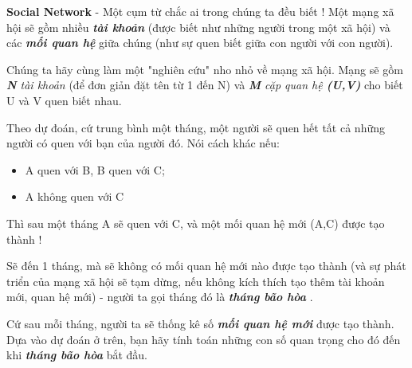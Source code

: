 \textbf{    Social Network   }   - Một cụm từ chắc ai trong chúng ta đều biết ! Một mạng xã hội sẽ gồm nhiều   \emph{\textbf{     tài khoản    }}   (được biết như những người trong một xã hội) và các   \emph{\textbf{     mối quan hệ    }}   giữa chúng (như sự quen biết giữa con người với con người).  

   Chúng ta hãy cùng làm một "nghiên cứu" nho nhỏ về mạng xã hội. Mạng sẽ gồm   \emph{\textbf{     N    }    tài khoản   }   (để đơn giản đặt tên từ 1 đến N) và   \emph{\textbf{     M    }    cặp quan hệ    \textbf{     (U,V)    }}   cho biết U và V quen biết nhau.  

   Theo dự đoán, cứ trung bình một tháng, một người sẽ quen hết tất cả những người có quen với bạn của người đó. Nói cách khác nếu:  
\begin{itemize}
	\item     A quen với B, B quen với C;   
	\item     A không quen với C   
\end{itemize}

   Thì sau một tháng A sẽ quen với C, và một mối quan hệ mới (A,C) được tạo thành !  

   Sẽ đến 1 tháng, mà sẽ không có mối quan hệ mới nào được tạo thành (và sự phát triển của mạng xã hội sẽ tạm dừng, nếu không kích thích tạo thêm tài khoản mới, quan hệ mới) - người ta gọi tháng đó là   \emph{\textbf{     tháng bão hòa    }}   .  

   Cứ sau mỗi tháng, người ta sẽ thống kê số   \emph{\textbf{     mối quan hệ mới    }}   được tạo thành. Dựa vào dự đoán ở trên, bạn hãy tính toán những con số quan trọng cho đó đến khi   \emph{\textbf{     tháng bão hòa    }}   bắt đầu.